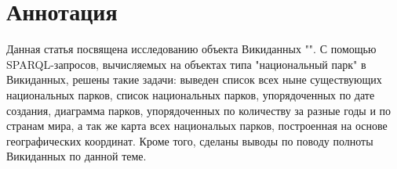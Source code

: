 \section{Аннотация}

Данная статья посвящена исследованию объекта Викиданных "". С помощью SPARQL-запросов, вычисляемых на объектах типа "национальный парк" в Викиданных, решены такие задачи: выведен список всех ныне существующих национальных парков, список национальных парков, упорядоченных по дате создания, диаграмма парков, упорядоченных по количеству за разные годы и по странам мира, а так же карта всех национальых парков, построенная на основе географических координат. Кроме того, сделаны выводы по поводу полноты Викиданных по данной теме.